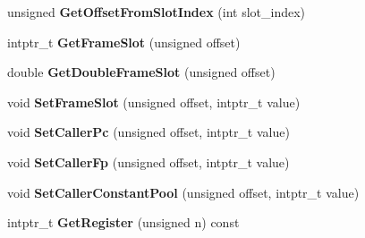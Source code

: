 \begin{DoxyCompactItemize}
\item 
\hypertarget{classv8_1_1internal_1_1_frame_description_a11310120b9a6165d3e072840d8ab346c}{}unsigned {\bfseries Get\+Offset\+From\+Slot\+Index} (int slot\+\_\+index)\label{classv8_1_1internal_1_1_frame_description_a11310120b9a6165d3e072840d8ab346c}

\item 
\hypertarget{classv8_1_1internal_1_1_frame_description_ad0706670dac1b0c2b6452eff67946d1e}{}intptr\+\_\+t {\bfseries Get\+Frame\+Slot} (unsigned offset)\label{classv8_1_1internal_1_1_frame_description_ad0706670dac1b0c2b6452eff67946d1e}

\item 
\hypertarget{classv8_1_1internal_1_1_frame_description_a9ad39f89378cc4c0bc027fab2803e67e}{}double {\bfseries Get\+Double\+Frame\+Slot} (unsigned offset)\label{classv8_1_1internal_1_1_frame_description_a9ad39f89378cc4c0bc027fab2803e67e}

\item 
\hypertarget{classv8_1_1internal_1_1_frame_description_aee24b65bf66e1559372f8b386a91e66a}{}void {\bfseries Set\+Frame\+Slot} (unsigned offset, intptr\+\_\+t value)\label{classv8_1_1internal_1_1_frame_description_aee24b65bf66e1559372f8b386a91e66a}

\item 
\hypertarget{classv8_1_1internal_1_1_frame_description_ad6f98224311b82550cadc0b9f43ecb57}{}void {\bfseries Set\+Caller\+Pc} (unsigned offset, intptr\+\_\+t value)\label{classv8_1_1internal_1_1_frame_description_ad6f98224311b82550cadc0b9f43ecb57}

\item 
\hypertarget{classv8_1_1internal_1_1_frame_description_a4df1a37c3cbc09409320c6b82cb2e36b}{}void {\bfseries Set\+Caller\+Fp} (unsigned offset, intptr\+\_\+t value)\label{classv8_1_1internal_1_1_frame_description_a4df1a37c3cbc09409320c6b82cb2e36b}

\item 
\hypertarget{classv8_1_1internal_1_1_frame_description_a6805273bc3d1f3e6cd2289fb93a007ce}{}void {\bfseries Set\+Caller\+Constant\+Pool} (unsigned offset, intptr\+\_\+t value)\label{classv8_1_1internal_1_1_frame_description_a6805273bc3d1f3e6cd2289fb93a007ce}

\item 
\hypertarget{classv8_1_1internal_1_1_frame_description_a464042607a8ecfac1ab8828b5b4e07aa}{}intptr\+\_\+t {\bfseries Get\+Register} (unsigned n) const \label{classv8_1_1internal_1_1_frame_description_a464042607a8ecfac1ab8828b5b4e07aa}


\end{DoxyCompactItemize}
